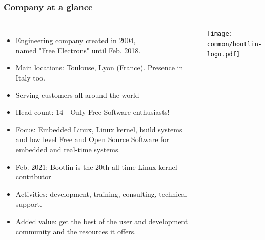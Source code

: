 \begin{frame}
\frametitle{Company at a glance}
  \begin{columns}
  \small
  \begin{itemize}
    \item Engineering company created in 2004,\\
	  named "Free Electrons" until Feb. 2018.
    \item Main locations: Toulouse, Lyon (France). Presence in Italy too.
    \item Serving customers all around the world
    \item Head count: 14 - Only Free Software enthusiasts!
    \item Focus: Embedded Linux, Linux kernel,
          build systems and low level Free and Open Source Software
          for embedded and real-time systems.
    \item Feb. 2021: Bootlin is the 20th all-time Linux kernel contributor
    \item Activities: development, training, consulting, technical
          support.
    \item Added value: get the best of the user and development
          community and the resources it offers.
  \end{itemize}
  \texttt{[image: common/bootlin-logo.pdf]}\\
  \vspace{0.25cm}

\end{columns}
\end{frame}
